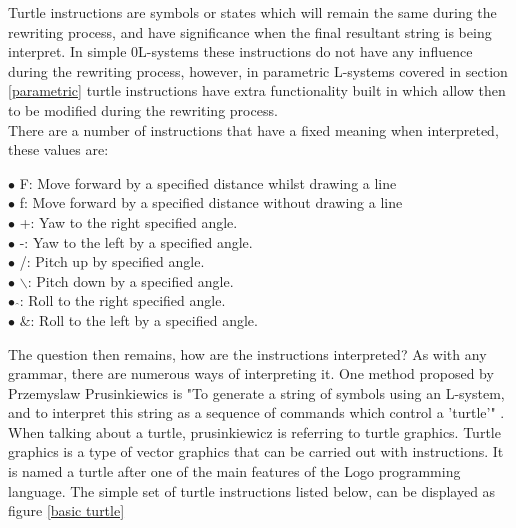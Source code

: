 \begin{flushleft}

Turtle instructions are symbols or states which will remain the same during the rewriting process, and have significance when the final resultant string is being interpret. In simple 0L-systems these instructions do not have any influence during the rewriting process, however, in parametric L-systems covered in section \ref{parametric} turtle instructions have extra functionality built in which allow then to be modified during the rewriting process. \\
There are a number of instructions that have a fixed meaning when interpreted, these values are:

\vspace{5mm}

$\bullet$ F: 				\hspace{10mm}  		Move forward by a specified distance whilst drawing a line \\
$\bullet$ f: 				\hspace{10mm} 		Move forward by a specified distance without drawing a line \\
$\bullet$ +: 				\hspace{10mm} 		Yaw to the right specified angle. \\
$\bullet$ -: 				\hspace{10mm} 		Yaw to the left by a specified angle.  \\
$\bullet$ /: 				\hspace{10mm} 		Pitch up by specified angle. \\
$\bullet$ $\backslash$: 	\hspace{10mm} 		Pitch down by a specified angle.  \\
$\bullet$ $\hat{}$: 		\hspace{10mm} 		Roll to the right specified angle. \\
$\bullet$ \&:				\hspace{10mm}  		Roll to the left by a specified angle.  \\

\vspace{5mm}

The question then remains, how are the instructions interpreted? As with any grammar, there are numerous ways of interpreting it. One method proposed by Przemyslaw Prusinkiewics is "To generate a string of symbols using an L-system, and to interpret this string as a sequence of commands which control a 'turtle'" \cite{prusinkiewicz1986graphical}. When talking about a turtle, prusinkiewicz is referring to turtle graphics. Turtle graphics is a type of vector graphics that can be carried out with instructions. It is named a turtle after one of the main features of the Logo programming language. The simple set of turtle instructions listed below, can be displayed as figure \ref{basic turtle}\\


\end{flushleft}
